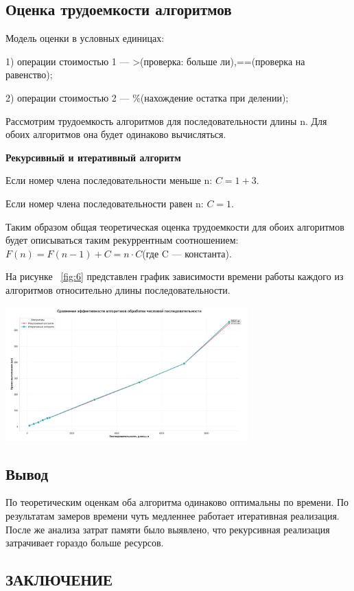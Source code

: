 \documentclass[14pt]{article}
\begin{document}
	\subsection{Оценка трудоемкости алгоритмов}
	
	Модель оценки в условных единицах:\par
	1) операции стоимостью 1 --- >(проверка: больше ли),==(проверка на равенство);\par
	2) операции стоимостью 2 --- \%(нахождение остатка при делении);\par
	Рассмотрим трудоемкость алгоритмов для последовательности длины n. Для обоих алгоритмов она будет одинаково вычисляться.\par
	\textbf{Рекурсивный и итеративный алгоритм}\par
	Если номер члена последовательности меньше n: $C = 1+3$.\par
	Если номер члена последовательности равен n: $C = 1$.\par
	Таким образом общая теоретическая оценка трудоемкости для обоих алгоритмов будет описываться таким рекуррентным соотношением: $F(n) = F(n-1) + C = n\cdot C$(где C --- константа).
	
	\newpage
	На рисунке ~\ref{fig:6} представлен график зависимости времени работы каждого из алгоритмов относительно длины последовательности.
	\begin{center}
		\includegraphics[width = 0.7\textwidth]{graphic.png}
		\label{fig:6}
	\end{center}
	\subsection{Вывод} 
	По теоретическим оценкам оба алгоритма одинаково оптимальны по времени. По результатам замеров времени чуть медленнее работает итеративная реализация. После же анализа затрат памяти было выявлено, что рекурсивная реализация затрачивает гораздо больше ресурсов.
	\newpage
	\begin{center}
		\section*{ЗАКЛЮЧЕНИЕ}
	\end{center}
	
\end{document}
